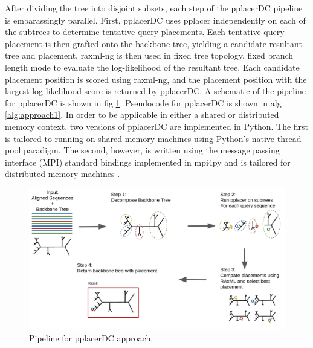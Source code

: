 \documentclass[10pt]{article}
\begin{document}
After dividing the tree into disjoint subsets, each step of the pplacerDC pipeline
is embarassingly parallel.
First, pplacerDC uses pplacer independently on each of the subtrees to determine tentative
query placements.
Each tentative query placement is then grafted onto the backbone tree, yielding a candidate
resultant tree and placement.
raxml-ng \cite{raxml} is then used in fixed tree topology, fixed branch length mode to evaluate
the log-likelihood of the resultant tree.
Each candidate placement position is scored using raxml-ng, and the placement position
with the largest log-likelihood score is returned by pplacerDC.
A schematic of the pipeline for pplacerDC is shown in fig \ref{fig:pplacerDC-pipeline}.
Pseudocode for pplacerDC is shown in alg \ref{alg:approach1}.
In order to be applicable in either a shared or distributed memory context,
two versions of pplacerDC are implemented in Python.
The first is tailored to running on shared memory machines using Python's
native thread pool paradigm.
The second, however, is written using the message passing interface (MPI) standard
bindings implemented in mpi4py and is tailored for distributed memory machines \cite{mpi4py-paper}.

\begin{figure}[h]
\centering
\includegraphics[width=\textwidth]{Figs/pplacerDCpipeline.png}
\caption{Pipeline for pplacerDC approach.}
\label{fig:pplacerDC-pipeline}
\end{figure}
\end{document}
